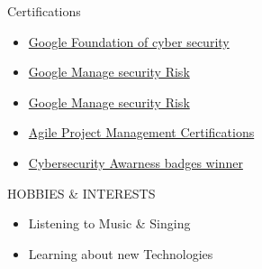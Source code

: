 \documentclass{resume}
\begin{document}
\vspace{-0.2em}
\begin{rSection}{Certifications}
    \begin{itemize}
        \item \href{https://coursera.org/share/dc5df20e6dc55a6b8b97cd5bc2d5d927}{Google Foundation of cyber security}
        \item \href{https://coursera.org/share/f75c0a81532aebe121347db41be1d9e5}{Google Manage security Risk}
        \item \href{https://coursera.org/share/f75c0a81532aebe121347db41be1d9e5}{Google Manage security Risk}

        \item \href{https://coursera.org/share/ae0e32c17961f344ea9a2e872c30deae}{Agile Project Management Certifications}
        \item \href{https://app.kajabi.com/certificates/1d00b4fe}{Cybersecurity Awarness badges winner}
    \end{itemize}
    \vspace{-0.4em}
\end{rSection}

\begin{rSection}{HOBBIES \& INTERESTS}
    \begin{itemize}
        \item Listening to Music \& Singing
              \vspace{-0.4em}
        \item Learning about new Technologies
    \end{itemize}
\end{rSection}
\vspace{-0.4em}

\end{document}
